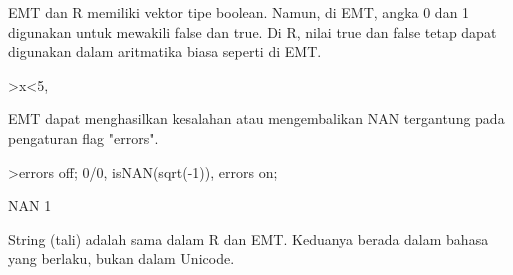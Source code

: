 \documentclass[12pt,arial,letterpaper]{book}
\begin{document}
\begin{eulercomment}
\begin{eulercomment}
\begin{eulercomment}
\begin{eulercomment}
\begin{eulercomment}
\begin{eulercomment}
\begin{eulercomment}
\begin{eulercomment}
\begin{eulercomment}
\begin{eulercomment}
\begin{eulercomment}
\begin{eulercomment}
\begin{eulercomment}
\begin{eulercomment}
\begin{eulercomment}
\begin{eulercomment}
\begin{eulercomment}
\begin{eulercomment}
\begin{eulercomment}
\begin{eulercomment}
\begin{eulercomment}
\begin{eulercomment}
\begin{eulercomment}
\begin{eulercomment}
\begin{eulercomment}
\begin{eulercomment}
\begin{eulercomment}
\begin{eulercomment}
\begin{eulercomment}
\begin{eulercomment}
\begin{eulercomment}
\begin{eulercomment}
\begin{eulercomment}
\begin{eulercomment}
\begin{eulercomment}
\begin{eulercomment}
\begin{eulercomment}
EMT dan R memiliki vektor tipe boolean. Namun, di EMT, angka 0 dan 1
digunakan untuk mewakili false dan true. Di R, nilai true dan false
tetap dapat digunakan dalam aritmatika biasa seperti di EMT.
\end{eulercomment}
\begin{eulerprompt}
>x<5, %
\end{eulerprompt}
\begin{euleroutput}
  [0,  0,  1,  0,  0]
  [0,  0,  3.1,  0,  0]
\end{euleroutput}
\begin{eulercomment}
EMT dapat menghasilkan kesalahan atau mengembalikan NAN tergantung
pada pengaturan flag "errors".
\end{eulercomment}
\begin{eulerprompt}
>errors off; 0/0, isNAN(sqrt(-1)), errors on;
\end{eulerprompt}
\begin{euleroutput}
  NAN
  1
\end{euleroutput}
\begin{eulercomment}
String (tali) adalah sama dalam R dan EMT. Keduanya berada dalam
bahasa yang berlaku, bukan dalam Unicode.


\end{eulercomment}
\end{eulercomment}
\end{eulercomment}
\end{eulercomment}
\end{eulercomment}
\end{eulercomment}
\end{eulercomment}
\end{eulercomment}
\end{eulercomment}
\end{eulercomment}
\end{eulercomment}
\end{eulercomment}
\end{eulercomment}
\end{eulercomment}
\end{eulercomment}
\end{eulercomment}
\end{eulercomment}
\end{eulercomment}
\end{eulercomment}
\end{eulercomment}
\end{eulercomment}
\end{eulercomment}
\end{eulercomment}
\end{eulercomment}
\end{eulercomment}
\end{eulercomment}
\end{eulercomment}
\end{eulercomment}
\end{eulercomment}
\end{eulercomment}
\end{eulercomment}
\end{eulercomment}
\end{eulercomment}
\end{eulercomment}
\end{eulercomment}
\end{eulercomment}
\end{eulercomment}
\end{document}
